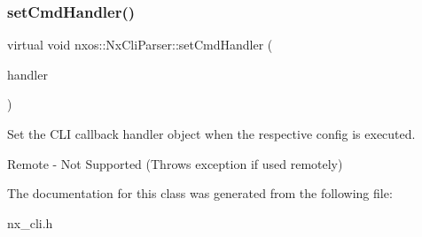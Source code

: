 \subsubsection{\texorpdfstring{set\+Cmd\+Handler()}{setCmdHandler()}}
{\footnotesize\ttfamily virtual void nxos\+::\+Nx\+Cli\+Parser\+::set\+Cmd\+Handler (\begin{DoxyParamCaption}\item[{\mbox{\hyperlink{classnxos_1_1_nx_cmd_handler}{Nx\+Cmd\+Handler}} $\ast$}]{handler }\end{DoxyParamCaption})\hspace{0.3cm}{\ttfamily [pure virtual]}}

Set the C\+LI callback handler object when the respective config is executed.

\begin{DoxyVerb}Remote - Not Supported (Throws exception if used remotely)\end{DoxyVerb}
 

The documentation for this class was generated from the following file\+:\begin{DoxyCompactItemize}
\item 
nx\+\_\+cli.\+h\end{DoxyCompactItemize}
